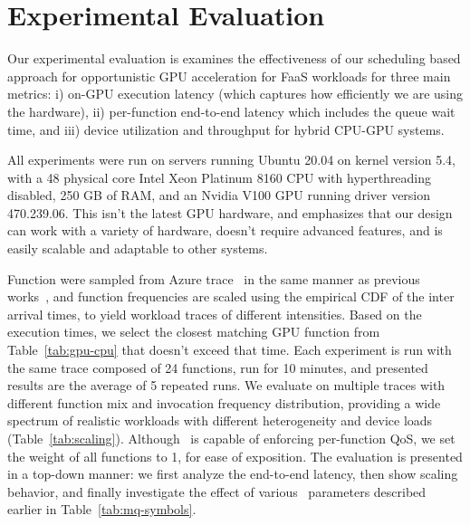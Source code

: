 \vspace*{-0.4cm}
\section{Experimental Evaluation}
\vspace*{\subsecspace}
\label{sec:eval}


Our experimental evaluation is examines the effectiveness of our scheduling based approach for opportunistic GPU acceleration for FaaS workloads for three main metrics: i) on-GPU execution latency (which captures how efficiently we are using the hardware), ii) per-function end-to-end latency which includes the queue wait time, and iii) device utilization and throughput for hybrid CPU-GPU systems.



All experiments were run on servers running Ubuntu 20.04 on kernel version 5.4, with a 48 physical core Intel Xeon Platinum 8160 CPU with hyperthreading disabled, 250 GB of RAM, and an Nvidia V100 GPU running driver version 470.239.06. 
This isn't the latest GPU hardware, and emphasizes that our design can work with a variety of hardware, doesn't require advanced features, and is easily scalable and adaptable to other systems.


Function were sampled from Azure trace~\cite{shahrad2020serverless} in the same manner as previous works~\cite{fuerst2023iluvatar,faaslb-hpdc22}, and function frequencies are scaled using the empirical CDF of the inter arrival times, to yield workload traces of different intensities.
Based on the execution times, we select the closest matching GPU function from Table~\ref{tab:gpu-cpu} that doesn't exceed that time. 
Each experiment is run with the same trace composed of 24 functions, run for 10 minutes, and presented results are the average of 5 repeated runs.
We evaluate on multiple traces with different function mix and invocation frequency distribution, providing a wide spectrum of realistic workloads with different heterogeneity and device loads (Table~\ref{tab:scaling}).
Although \QName~is capable of enforcing per-function QoS, we set the weight of all functions to 1, for ease of exposition. 
The evaluation is presented in a top-down manner: we first analyze the end-to-end latency, then show scaling behavior, and finally investigate the effect of various \QName~parameters described earlier in Table~\ref{tab:mq-symbols}. 


